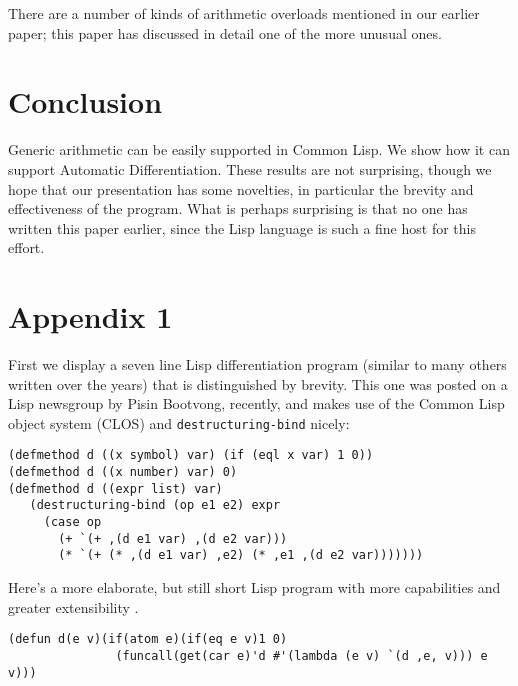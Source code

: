 \documentclass{article}
\begin{document}
{{{{There are a number of kinds of arithmetic overloads mentioned in
our earlier paper; this paper has discussed in detail one of
the more unusual ones.

{\section {Conclusion}

Generic arithmetic can be easily supported in Common Lisp.  We show
how it can support Automatic Differentiation.  These results are not surprising, though
we hope that our presentation has some novelties, in particular
the brevity and effectiveness of the program.  What is perhaps
surprising is that no one has written this paper earlier, since the
Lisp language is such a fine host for this effort.
}
\section*{Appendix 1}

First we display a seven line Lisp differentiation program (similar to many
others written over the years) that is distinguished
by brevity.  This one was posted on a Lisp newsgroup by Pisin Bootvong,
recently, and makes use of the Common Lisp object system (CLOS)
and {\tt destructuring-bind} nicely:

\begin{verbatim}
(defmethod d ((x symbol) var) (if (eql x var) 1 0))
(defmethod d ((x number) var) 0)
(defmethod d ((expr list) var)
   (destructuring-bind (op e1 e2) expr
     (case op
       (+ `(+ ,(d e1 var) ,(d e2 var)))
       (* `(+ (* ,(d e1 var) ,e2) (* ,e1 ,(d e2 var))))))) 
\end{verbatim}

Here's a more elaborate, but still short Lisp program with more
capabilities and greater extensibility \cite{fateman98}.

\begin{verbatim}
(defun d(e v)(if(atom e)(if(eq e v)1 0)
               (funcall(get(car e)'d #'(lambda (e v) `(d ,e, v))) e v)))


\end{verbatim}}}}}
\end{document}
